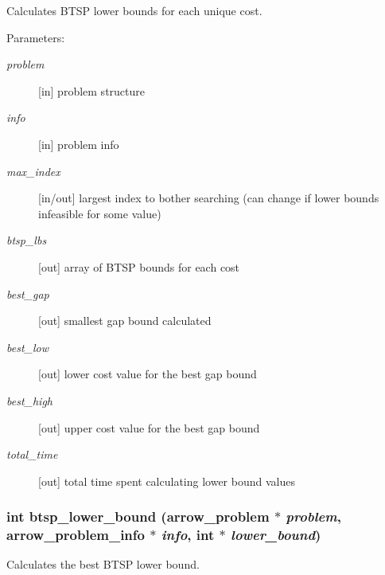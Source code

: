 Calculates BTSP lower bounds for each unique cost. 

\begin{Desc}
\item[Parameters:]
\begin{description}
\item[{\em problem}]\mbox{[}in\mbox{]} problem structure \item[{\em info}]\mbox{[}in\mbox{]} problem info \item[{\em max\_\-index}]\mbox{[}in/out\mbox{]} largest index to bother searching (can change if lower bounds infeasible for some value) \item[{\em btsp\_\-lbs}]\mbox{[}out\mbox{]} array of BTSP bounds for each cost \item[{\em best\_\-gap}]\mbox{[}out\mbox{]} smallest gap bound calculated \item[{\em best\_\-low}]\mbox{[}out\mbox{]} lower cost value for the best gap bound \item[{\em best\_\-high}]\mbox{[}out\mbox{]} upper cost value for the best gap bound \item[{\em total\_\-time}]\mbox{[}out\mbox{]} total time spent calculating lower bound values \end{description}
\end{Desc}
\hypertarget{lib_2baltsp_2baltsp-ib2_8c_90a22293c99499a2da22fd0d1a16acb4}{
\subsubsection[{btsp\_\-lower\_\-bound}]{\setlength{\rightskip}{0pt plus 5cm}int btsp\_\-lower\_\-bound ({\bf arrow\_\-problem} $\ast$ {\em problem}, \/  {\bf arrow\_\-problem\_\-info} $\ast$ {\em info}, \/  int $\ast$ {\em lower\_\-bound})}}
\label{lib_2baltsp_2baltsp-ib2_8c_90a22293c99499a2da22fd0d1a16acb4}


Calculates the best BTSP lower bound. 

